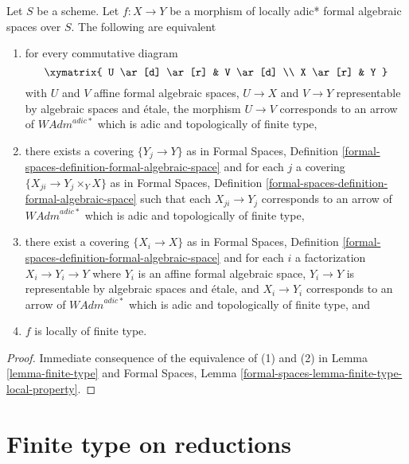 \begin{lemma}
\label{lemma-finite-type-morphisms}
Let $S$ be a scheme. Let $f : X \to Y$ be a morphism of
locally adic* formal algebraic spaces over $S$.
The following are equivalent
\begin{enumerate}
\item for every commutative diagram
$$
\xymatrix{
U \ar[d] \ar[r] & V \ar[d] \\
X \ar[r] & Y
}
$$
with $U$ and $V$ affine formal algebraic spaces, $U \to X$ and $V \to Y$
representable by algebraic spaces and \'etale, the morphism $U \to V$
corresponds to an arrow of $\textit{WAdm}^{adic*}$ which is
adic and topologically of finite type,
\item there exists a covering $\{Y_j \to Y\}$ as in
Formal Spaces,
Definition \ref{formal-spaces-definition-formal-algebraic-space}
and for each $j$
a covering $\{X_{ji} \to Y_j \times_Y X\}$ as in
Formal Spaces,
Definition \ref{formal-spaces-definition-formal-algebraic-space}
such that each $X_{ji} \to Y_j$  corresponds
to an arrow of $\textit{WAdm}^{adic*}$ which is adic and
topologically of finite type,
\item there exist a covering $\{X_i \to X\}$ as in
Formal Spaces,
Definition \ref{formal-spaces-definition-formal-algebraic-space}
and for each $i$ a factorization $X_i \to Y_i \to Y$ where $Y_i$
is an affine formal algebraic space, $Y_i \to Y$ is representable
by algebraic spaces and \'etale, and $X_i \to Y_i$ corresponds
to an arrow of $\textit{WAdm}^{adic*}$ which is adic and topologically
of finite type, and
\item $f$ is locally of finite type.
\end{enumerate}
\end{lemma}

\begin{proof}
Immediate consequence of the equivalence of (1) and (2) in
Lemma \ref{lemma-finite-type} and
Formal Spaces, Lemma
\ref{formal-spaces-lemma-finite-type-local-property}.
\end{proof}










\section{Finite type on reductions}
\label{section-finite-type-red}

